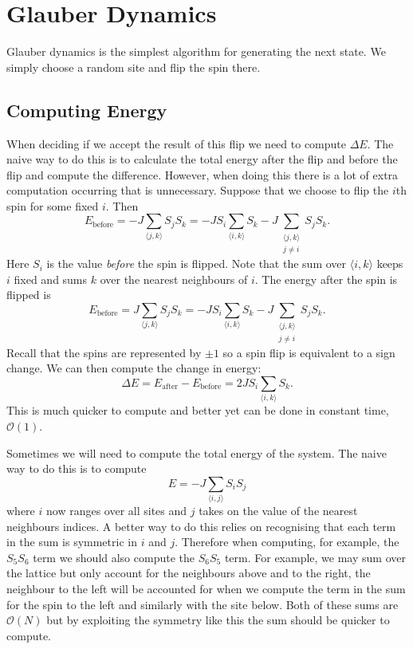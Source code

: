 \documentclass[fleqn]{NotesClass}
\newcommand*{\order}{\mathcal{O}}
\begin{document}
    \section{Glauber Dynamics}
    Glauber dynamics is the simplest algorithm for generating the next state.
    We simply choose a random site and flip the spin there.
    
    \subsection{Computing Energy}
    When deciding if we accept the result of this flip we need to compute \(\Delta E\).
    The naive way to do this is to calculate the total energy after the flip and before the flip and compute the difference.
    However, when doing this there is a lot of extra computation occurring that is unnecessary.
    Suppose that we choose to flip the \(i\)th spin for some fixed \(i\).
    Then
    \begin{equation}
        E_{\text{before}} = -J\sum_{\langle j, k \rangle} S_jS_k = -JS_i\sum_{\langle i, k \rangle} S_k - J\sum_{\substack{\langle j, k \rangle\\ j \ne i}} S_jS_k.
    \end{equation}
    Here \(S_i\) is the value \emph{before} the spin is flipped.
    Note that the sum over \(\langle i, k \rangle\) keeps \(i\) fixed and sums \(k\) over the nearest neighbours of \(i\).
    The energy after the spin is flipped is
    \begin{equation}
        E_{\text{before}} = J\sum_{\langle j, k \rangle} S_jS_k = -JS_i\sum_{\langle i, k \rangle} S_k - J\sum_{\substack{\langle j, k \rangle\\ j \ne i}} S_jS_k.
    \end{equation}
    Recall that the spins are represented by \(\pm 1\) so a spin flip is equivalent to a sign change.
    We can then compute the change in energy:
    \begin{equation}
        \Delta E = E_{\text{after}} - E_{\text{before}} = 2JS_i\sum_{\langle i, k \rangle} S_k.
    \end{equation}
    This is much quicker to compute and better yet can be done in constant time, \(\order(1)\).
    
    Sometimes we will need to compute the total energy of the system.
    The naive way to do this is to compute
    \begin{equation}
        E = -J\sum_{\langle i, j \rangle} S_iS_j
    \end{equation}
    where \(i\) now ranges over all sites and \(j\) takes on the value of the nearest neighbours indices.
    A better way to do this relies on recognising that each term in the sum is symmetric in \(i\) and \(j\).
    Therefore when computing, for example, the \(S_5S_6\) term we should also compute the \(S_6S_5\) term.
    For example, we may sum over the lattice but only account for the neighbours above and to the right, the neighbour to the left will be accounted for when we compute the term in the sum for the spin to the left and similarly with the site below.
    Both of these sums are \(\order(N)\) but by exploiting the symmetry like this the sum should be quicker to compute.
    
\end{document}
